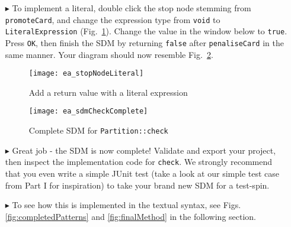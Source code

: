 \begin{itemize}
\vspace{0.5cm}

\item[$\blacktriangleright$] To implement a literal, double click the stop node stemming from  \texttt{promoteCard}, and change the expression type from
\texttt{void} to \texttt{LiteralEx\-pression} (Fig.~\ref{fig:sdm_check_literal_exp}). Change the value in the window below to \texttt{true}. Press \texttt{OK},
then finish the SDM by returning \texttt{false} after \texttt{penaliseCard} in the same manner. Your diagram should now resemble
Fig.~\ref{fig:sdm_check_finish}.

\begin{figure}[htbp]
\begin{center}
  \texttt{[image: ea\_stopNodeLiteral]}
  \caption{Add a return value with a literal expression}
  \label{fig:sdm_check_literal_exp}
\end{center}
\end{figure}

\begin{figure}[htbp]
\begin{center}
  \texttt{[image: ea\_sdmCheckComplete]}
  \caption{Complete SDM for \texttt{Partition::check}}
  \label{fig:sdm_check_finish}
\end{center}
\end{figure}

\clearpage

\item[$\blacktriangleright$] Great job - the SDM is now complete! Validate and export your project, then inspect the implementation code for \texttt{check}. We
strongly recommend that you even write a simple JUnit test (take a look at our simple test case from Part I for inspiration) to take your brand new SDM for a
test-spin.

\item[$\blacktriangleright$] To see how this is implemented in the textual syntax, see Figs. \ref{fig:completedPatterns} and \ref{fig:finalMethod} in the
following section.


\end{itemize}
